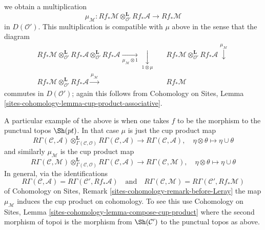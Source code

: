 we obtain a multiplication
$$
\mu_\mathcal{M} :
Rf_*\mathcal{M} \otimes_{\mathcal{O}'}^\mathbf{L} Rf_*\mathcal{A}
\longrightarrow
Rf_*\mathcal{M}
$$
in $D(\mathcal{O}')$. This multiplication is compatible with $\mu$
above in the sense that the diagram
$$
\begin{array}{ccc}Rf_*\mathcal{M} \otimes_{\mathcal{O}'}^\mathbf{L} Rf_*\mathcal{A}
\otimes_{\mathcal{O}'}^\mathbf{L} Rf_*\mathcal{A}
\underset{\mu_\mathcal{M} \otimes 1}{\longrightarrow}\underset{1 \otimes \mu}{\downarrow} &  & Rf_*\mathcal{M} \otimes_{\mathcal{O}'}^\mathbf{L} Rf_*\mathcal{A}
\overset{\mu_\mathcal{M}}{\downarrow} \\ Rf_*\mathcal{M} \otimes_{\mathcal{O}'}^\mathbf{L} Rf_*\mathcal{A}
\overset{\mu_\mathcal{M}}{\longrightarrow} &  & Rf_*\mathcal{M}\end{array}
$$
commutes in $D(\mathcal{O}')$; again this follows from
Cohomology on Sites, Lemma \ref{sites-cohomology-lemma-cup-product-associative}.

\medskip\noindent
A particular example of the above is when one takes $f$ to be the morphism
to the punctual topos $\Sh(pt)$. In that case $\mu$ is just the cup product
map
$$
R\Gamma(\mathcal{C}, \mathcal{A})
\otimes_{\Gamma(\mathcal{C}, \mathcal{O})}^\mathbf{L}
R\Gamma(\mathcal{C}, \mathcal{A})
\longrightarrow
R\Gamma(\mathcal{C}, \mathcal{A}),
\quad \eta \otimes \theta \mapsto \eta \cup \theta
$$
and similarly $\mu_\mathcal{M}$ is the cup product map
$$
R\Gamma(\mathcal{C}, \mathcal{M})
\otimes_{\Gamma(\mathcal{C}, \mathcal{O})}^\mathbf{L}
R\Gamma(\mathcal{C}, \mathcal{A})
\longrightarrow
R\Gamma(\mathcal{C}, \mathcal{M}),
\quad \eta \otimes \theta \mapsto \eta \cup \theta
$$
In general, via the identifications
$$
R\Gamma(\mathcal{C}, \mathcal{A}) =
R\Gamma(\mathcal{C}', Rf_*\mathcal{A})
\quad\text{and}\quad
R\Gamma(\mathcal{C}, \mathcal{M}) =
R\Gamma(\mathcal{C}', Rf_*\mathcal{M})
$$
of Cohomology on Sites, Remark \ref{sites-cohomology-remark-before-Leray}
the map $\mu_\mathcal{M}$ induces the cup product on cohomology.
To see this use
Cohomology on Sites, Lemma \ref{sites-cohomology-lemma-compose-cup-product}
where the second morphism of topoi is the morphism from $\Sh(\mathcal{C}')$
to the punctual topos as above.


